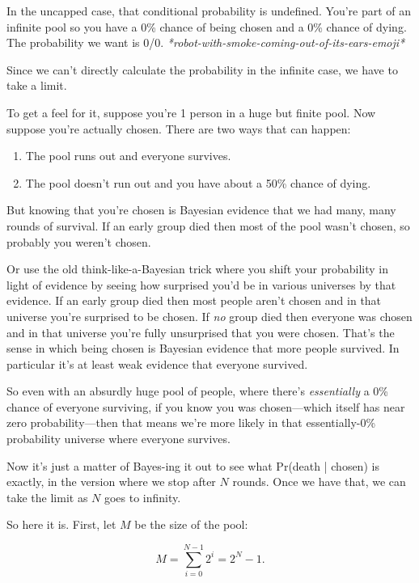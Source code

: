 \documentclass[article,twocolumn]{memoir}
\begin{document}
In the uncapped case, that conditional probability is undefined. 
You're part of an infinite pool so you have a 0\% chance of being chosen and a 0\% chance of dying. 
The probability we want is 0/0. 
\emph{*robot-with-smoke-coming-out-of-its-ears-emoji*}

Since we can't directly calculate the probability in the infinite case, we have to take a limit.

\vspace{2em}

To get a feel for it, suppose you're 1 person in a huge but finite pool.
Now suppose you're actually chosen. 
There are two ways that can happen: 
\begin{enumerate}
\item The pool runs out and everyone survives.
\item The pool doesn't run out and you have about a 50\% chance of dying. 
\end{enumerate}
But knowing that you're chosen is Bayesian evidence that we had many, many rounds of survival. 
If an early group died then most of the pool wasn't chosen, so probably you weren't chosen.

Or use the old think-like-a-Bayesian trick where you shift your probability in light of evidence by seeing how surprised you'd be in various universes by that evidence.
If an early group died then most people aren't chosen and in that universe you're surprised to be chosen. 
If \emph{no} group died then everyone was chosen and in that universe you're fully unsurprised that you were chosen. 
That's the sense in which being chosen is Bayesian evidence that more people survived. 
In particular it's at least weak evidence that everyone survived.

So even with an absurdly huge pool of people, where there's \emph{essentially} a 0\% chance of everyone surviving, if you know you was chosen---which itself has near zero probability---then that means we're more likely in that essentially-0\% probability universe where everyone survives.

\vspace{2em}

Now it's just a matter of Bayes-ing it out to see what Pr(death | chosen) is exactly, in the version where we stop after $N$ rounds.
Once we have that, we can take the limit as $N$ goes to infinity.

So here it is.
First, let $M$ be the size of the pool:

$$M = \sum_{i=0}^{N-1} 2^i = 2^N-1.$$
\end{document}
